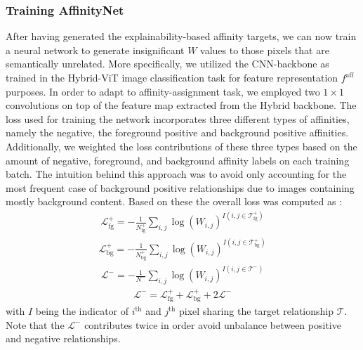 \documentclass{article}
\begin{document}
\subsubsection{Training AffinityNet}
After having generated the explainability-based affinity targets, we can now train a neural network to generate insignificant $W$ values to those pixels that are semantically unrelated. More specifically, we utilized the CNN-backbone as trained in the Hybrid-ViT image classification task for feature representation $f^\text{aff}$ purposes. In order to adapt to affinity-assignment task, we employed two $1\times1$ convolutions on top of the feature map extracted from the Hybrid backbone. The loss used for training the network incorporates three different types of affinities, namely the negative, the foreground positive and background positive affinities. Additionally, we weighted the loss contributions of these three types based on the amount of negative, foreground, and background affinity labels on each training batch. The intuition behind this approach was to avoid only accounting for the most frequent case of background positive relationships due to images containing mostly background content. Based on these the overall loss was computed as :
\begin{align*}
\label{eq:dropweight}
\mathcal{L}_\text{fg}^+ =- \frac{1}{N_\text{fg}^+}\sum_{i,j}\log(W_{i,j})^{I(i,j\in \mathcal{T}_\text{fg}^+)}
\end{align*}
\begin{align*}
\label{eq:dropweight}
\mathcal{L}_\text{bg}^+ =- \frac{1}{N_\text{bg}^+}\sum_{i,j}\log(W_{i,j})^{I(i,j\in \mathcal{T}_\text{bg}^+) }
\end{align*}
\begin{align*}
\label{eq:dropweight}
\mathcal{L}^- =- \frac{1}{N^-}\sum_{i,j}\log(W_{i,j})^{I(i,j\in \mathcal{T}^-) }
\end{align*}
\begin{align*}
\label{eq:dropweight}
\mathcal{L}^- = \mathcal{L}_\text{fg}^+ + \mathcal{L}_\text{bg}^+ + 2\mathcal{L}^-
\end{align*}
with $I$ being the indicator of $i^\text{th}$ and $j^\text{th}$ pixel sharing the target relationship $\mathcal{T}$. Note that the $\mathcal{L}^-$ contributes twice in order avoid unbalance between positive and negative relationships.
\end{document}

